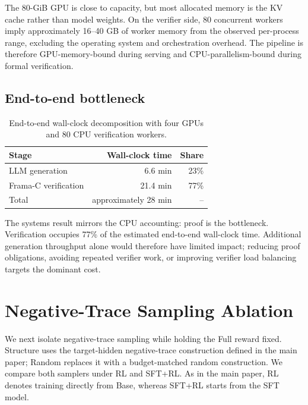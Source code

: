 \documentclass[10pt]{article}
\begin{document}
The 80-GiB GPU is close to capacity, but most allocated memory is the KV cache
rather than model weights.  On the verifier side, 80 concurrent workers imply
approximately 16--40 GB of worker memory from the observed per-process range,
excluding the operating system and orchestration overhead.  The pipeline is
therefore GPU-memory-bound during serving and CPU-parallelism-bound during
formal verification.

\subsection{End-to-end bottleneck}

\begin{table}[H]
\centering
\begin{tabular}{lrr}
\toprule
\rowcolor{headerbg}
Stage & Wall-clock time & Share \\
\midrule
LLM generation       & 6.6 min  & 23\% \\
Frama-C verification & 21.4 min & 77\% \\
Total                & approximately 28 min & -- \\
\bottomrule
\end{tabular}
\caption{End-to-end wall-clock decomposition with four GPUs and 80 CPU
verification workers.}
\label{tab:supp-resource-wallclock}
\end{table}

The systems result mirrors the CPU accounting: proof is the bottleneck.
Verification occupies 77\% of the estimated end-to-end wall-clock time.  Additional
generation throughput alone would therefore have limited impact; reducing
proof obligations, avoiding repeated verifier work, or improving verifier
load balancing targets the dominant cost.

\section{Negative-Trace Sampling Ablation}
\label{app:supp-sampler}

We next isolate negative-trace sampling while holding the Full reward fixed.
Structure uses the target-hidden negative-trace construction defined in the
main paper; Random replaces it with a budget-matched random construction.  We
compare both samplers under RL and SFT+RL.  As in the main paper, RL denotes
training directly from Base, whereas SFT+RL starts from the SFT model.
\end{document}
